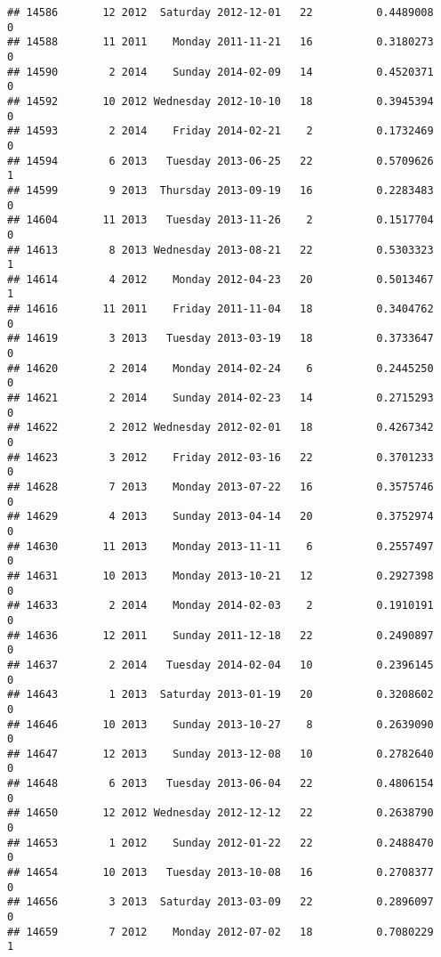 \documentclass[
]{article}
\begin{document}
\begin{verbatim}
## 14586       12 2012  Saturday 2012-12-01   22          0.4489008             0
## 14588       11 2011    Monday 2011-11-21   16          0.3180273             0
## 14590        2 2014    Sunday 2014-02-09   14          0.4520371             0
## 14592       10 2012 Wednesday 2012-10-10   18          0.3945394             0
## 14593        2 2014    Friday 2014-02-21    2          0.1732469             0
## 14594        6 2013   Tuesday 2013-06-25   22          0.5709626             1
## 14599        9 2013  Thursday 2013-09-19   16          0.2283483             0
## 14604       11 2013   Tuesday 2013-11-26    2          0.1517704             0
## 14613        8 2013 Wednesday 2013-08-21   22          0.5303323             1
## 14614        4 2012    Monday 2012-04-23   20          0.5013467             1
## 14616       11 2011    Friday 2011-11-04   18          0.3404762             0
## 14619        3 2013   Tuesday 2013-03-19   18          0.3733647             0
## 14620        2 2014    Monday 2014-02-24    6          0.2445250             0
## 14621        2 2014    Sunday 2014-02-23   14          0.2715293             0
## 14622        2 2012 Wednesday 2012-02-01   18          0.4267342             0
## 14623        3 2012    Friday 2012-03-16   22          0.3701233             0
## 14628        7 2013    Monday 2013-07-22   16          0.3575746             0
## 14629        4 2013    Sunday 2013-04-14   20          0.3752974             0
## 14630       11 2013    Monday 2013-11-11    6          0.2557497             0
## 14631       10 2013    Monday 2013-10-21   12          0.2927398             0
## 14633        2 2014    Monday 2014-02-03    2          0.1910191             0
## 14636       12 2011    Sunday 2011-12-18   22          0.2490897             0
## 14637        2 2014   Tuesday 2014-02-04   10          0.2396145             0
## 14643        1 2013  Saturday 2013-01-19   20          0.3208602             0
## 14646       10 2013    Sunday 2013-10-27    8          0.2639090             0
## 14647       12 2013    Sunday 2013-12-08   10          0.2782640             0
## 14648        6 2013   Tuesday 2013-06-04   22          0.4806154             0
## 14650       12 2012 Wednesday 2012-12-12   22          0.2638790             0
## 14653        1 2012    Sunday 2012-01-22   22          0.2488470             0
## 14654       10 2013   Tuesday 2013-10-08   16          0.2708377             0
## 14656        3 2013  Saturday 2013-03-09   22          0.2896097             0
## 14659        7 2012    Monday 2012-07-02   18          0.7080229             1

\end{verbatim}
\end{document}
